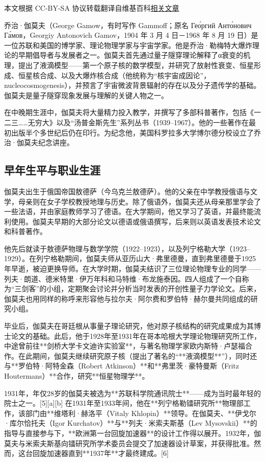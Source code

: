 
本文根据 CC-BY-SA 协议转载翻译自维基百科\href{https://en.wikipedia.org/wiki/George_Gamow}{相关文章}

乔治·伽莫夫（George Gamow，有时写作 Gammoff；原名 Гео́ргий Анто́нович Га́мов，Georgiy Antonovich Gamov，1904 年 3 月 4 日－1968 年 8 月 19 日）是一位苏联和美国的博学家、理论物理学家与宇宙学家。他是乔治·勒梅特大爆炸理论的早期倡导者与发展者之一。伽莫夫首先通过量子隧穿理论解释了α衰变的机理，提出了液滴模型——第一个原子核的数学模型，并研究了放射性衰变、恒星形成、恒星核合成、以及大爆炸核合成（他统称为“核宇宙成因论”，nucleocosmogenesis），并预言了宇宙微波背景辐射的存在以及分子遗传学的基础。伽莫夫是量子隧穿现象发展与理解的关键人物之一。

在中晚期生涯中，伽莫夫将大量精力投入教学，并撰写了多部科普著作，包括《一二三……无穷大》以及“汤普金斯先生”系列丛书（1939–1967）。他的一些著作在最初出版半个多世纪后仍在印行。为纪念他，美国科罗拉多大学博尔德分校设立了乔治·伽莫夫纪念讲座。
\subsection{早年生平与职业生涯}
伽莫夫出生于俄国帝国敖德萨（今乌克兰敖德萨）。他的父亲在中学教授俄语与文学，母亲则在女子学校教授地理与历史。除了俄语外，伽莫夫还从母亲那里学会了一些法语，并由家庭教师学习了德语。在大学期间，他又学习了英语，并最终能流利使用。伽莫夫早期的大部分论文以德语或俄语撰写，后来则以英语发表技术论文和科普著作。

他先后就读于敖德萨物理与数学学院（1922–1923），以及列宁格勒大学（1923–1929）。在列宁格勒期间，伽莫夫师从亚历山大·弗里德曼，直到弗里德曼于1925年早逝，被迫更换导师。在大学时期，伽莫夫结识了三位理论物理专业的同学——列夫·朗道、德米特里·伊万年科和马特维·布龙施泰因。四人组成了一个自称为“三剑客”的小组，定期聚会讨论并分析当时发表的开创性量子力学论文。后来，伽莫夫也用同样的称呼来形容他与拉尔夫·阿尔费和罗伯特·赫尔曼共同组成的研究小组。

毕业后，伽莫夫在哥廷根从事量子理论研究，他对原子核结构的研究成果成为其博士论文的基础。此后，他于1928年至1931年在哥本哈根大学理论物理研究所工作，中途曾前往**剑桥大学卡文迪许实验室**，与著名物理学家欧内斯特·卢瑟福合作。在此期间，伽莫夫继续研究原子核（提出了著名的“**液滴模型**”），同时还与**罗伯特·阿特金森（Robert Atkinson）**和**弗里茨·豪特曼斯（Fritz Houtermans）**合作，研究**恒星物理学**。

1931年，年仅28岁的伽莫夫被选为**苏联科学院通讯院士**——成为当时最年轻的院士之一。[5][a][b] 在1931年至1933年间，他在**列宁格勒镭研究所**物理部工作，该部门由**维塔利·赫洛平（Vitaly Khlopin）**领导。在伽莫夫、**伊戈尔·库尔恰托夫（Igor Kurchatov）**与**列夫·米索夫斯基（Lev Mysovskii）**的指导与直接参与下，**欧洲第一台回旋加速器**的设计工作得以展开。1932年，伽莫夫与米索夫斯基向镭研究所学术委员会提交了加速器设计草案，并获得批准。然而，这台回旋加速器直到**1937年**才最终建成。[6]
